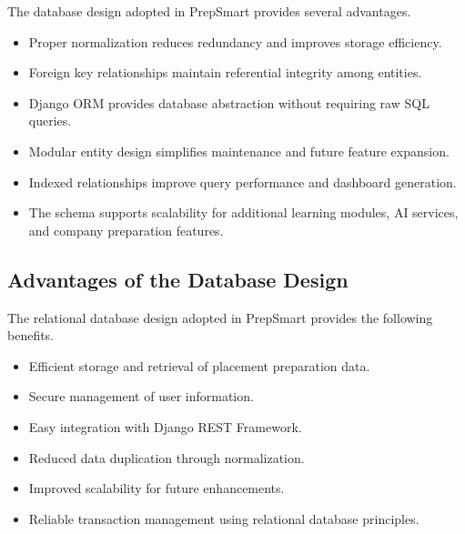 The database design adopted in PrepSmart provides several advantages.

\begin{itemize}

\item Proper normalization reduces redundancy and improves storage efficiency.

\item Foreign key relationships maintain referential integrity among entities.

\item Django ORM provides database abstraction without requiring raw SQL queries.

\item Modular entity design simplifies maintenance and future feature expansion.

\item Indexed relationships improve query performance and dashboard generation.

\item The schema supports scalability for additional learning modules, AI services, and company preparation features.

\end{itemize}

\subsection{Advantages of the Database Design}

The relational database design adopted in PrepSmart provides the following benefits.

\begin{itemize}

\item Efficient storage and retrieval of placement preparation data.

\item Secure management of user information.

\item Easy integration with Django REST Framework.

\item Reduced data duplication through normalization.

\item Improved scalability for future enhancements.

\item Reliable transaction management using relational database principles.

\end{itemize}


